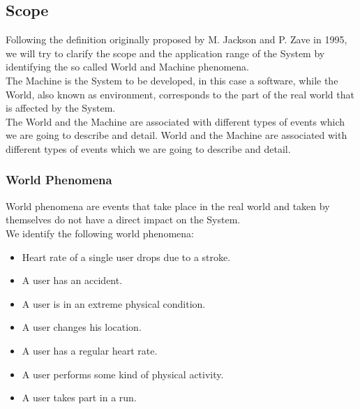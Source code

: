 \documentclass[titlepage]{article}
\begin{document}
	\subsection{Scope}
Following the definition originally proposed by M. Jackson and P. Zave in 1995, we will try to clarify the scope and the application range of the System by identifying the so called World and Machine phenomena.\\
The Machine is the System to be developed, in this case a software, while the World, also known as environment, corresponds to the part of the real world that is affected by the System. \\
The World and the Machine are associated with different types of events which we are going to describe and detail.
World and the Machine are associated with different types of events which we are going to describe and detail.\\		
		\subsubsection{World Phenomena}
		World phenomena are events that take place in the real world and taken by themselves do not have a direct impact on the System.\\
We identify the following world phenomena:
		\begin{itemize}
			\item Heart rate of a single user drops due to a stroke.
			\item A user has an accident.
			\item A user is in an extreme physical condition.
			\item A user changes his location.
			\item A user has a regular heart rate.
			\item A user performs some kind of physical activity.
			\item A user takes part in a run.
		\end{itemize}
\end{document}
